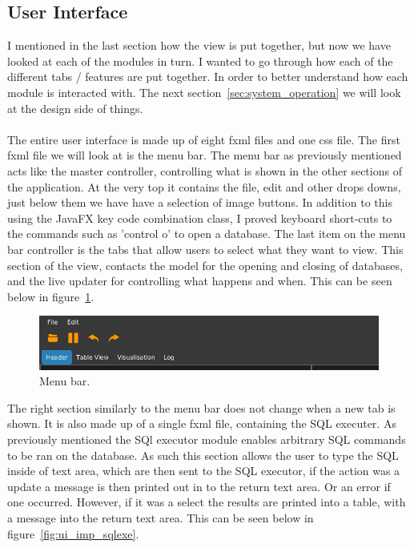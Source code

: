 \subsection{User Interface}
\label{subsec:user_interface_imp}

I mentioned in the last section how the view is put together, but now we have looked at each of the modules in turn. I wanted to go through how each of the different tabs / features are put together. In order to better understand how each module is interacted with. The next section~\ref{sec:system_operation} we will look at the design side of things. 
\\\\
The entire user interface is made up of eight fxml files and one css file.  The first fxml file we will look at is the menu bar. The menu bar as previously mentioned acts like the master controller, controlling what is shown in the other sections of the application. At the very top it contains the file, edit and other drops downs, just below them we have have a selection of image buttons. In addition to this using the JavaFX key code combination class, I proved keyboard short-cuts to the commands such as 'control o' to open a database. The last item on the menu bar controller is the tabs that allow users to select what they want to view. This section of the view, contacts the model for the opening and closing of databases, and the live updater for controlling what happens and when. This can be seen below in figure~\ref{fig:ui_screen}.

\begin{figure}[H]
	\centering
	\includegraphics[scale=0.32]{images/ui_screen.png}
	\caption{Menu bar.}
	\label{fig:ui_screen}
\end{figure}

The right section similarly to the menu bar does not change when a new tab is shown. It is also made up of a single fxml file, containing the SQL executer. As previously mentioned the SQl executor module enables arbitrary SQL commands to be ran on the database. As such this section allows the user to type the SQL inside of text area, which are then sent to the SQL executor, if the action was a update a message is then printed out in to the return text area. Or an error if one occurred. However, if it was a select the results are printed into a table, with a message into the return text area. This can be seen below in figure~\ref{fig:ui_imp_sqlexe}.

